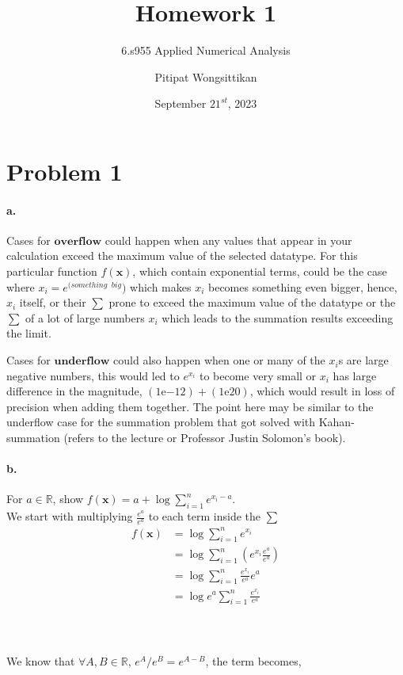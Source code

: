 \documentclass{scrartcl}
\begin{document}
\title{Homework 1}
\subtitle{6.s955 Applied Numerical Analysis}
\author{Pitipat Wongsittikan }
\date{September $21^{st}$, 2023}
\maketitle


\section*{Problem 1}
\paragraph{a.} 
Cases for $\mathbf{overflow}$ could happen when any values that appear in your calculation exceed the maximum value of the selected datatype. For this particular function $f(\mathbf{x})$, which contain exponential terms, could be the case where $x_{i} = e^{(something}$ $^{big})$ which makes $x_{i}$ becomes something even bigger, hence, $x_{i}$ itself, or their $\sum$ prone to exceed the maximum value of the datatype or the $\sum$ of a lot of large numbers $x_{i}$ which leads to the summation results exceeding the limit. 

Cases for $\mathbf{underflow}$ could also happen when one or many of the $x_{i}$s are large negative numbers, this would led to $e^{x_i}$ to become very small or $x_{i}$ has large difference in the magnitude, $(1\mathrm{e}{-12})+(1\mathrm{e}{20})$, which would result in loss of precision when adding them together. The point here may be similar to the underflow case for the summation problem that got solved with Kahan-summation (refers to the lecture or Professor Justin Solomon's book). 

\paragraph{b.}
For $a \in \mathbb{R}$, show $f(\boldsymbol{x}) = a + \log \sum_{i=1}^{n} e^{x_i-a}$.\\
We start with multiplying $\frac{e^{a}}{e^{a}}$ to each term inside the $\sum$
\begin{align}
f(\boldsymbol{x}) 
&= \log \sum_{i=1}^{n} e^{x_i}\\
&= \log \sum_{i=1}^{n} (e^{x_i} \frac{e^{a}}{e^{a}})\\
&= \log \sum_{i=1}^{n} \frac{e^{x_i}}{e^{a}} e^{a}\\
&= \log {e^{a}}\sum_{i=1}^{n} \frac{e^{x_i}}{e^{a}}
\end{align}
\\\\\\
We know that $\forall A,B\in \mathbb{R}$, $ e^{A}/e^{B} = e^{A-B}$, the term becomes,
\end{document}
